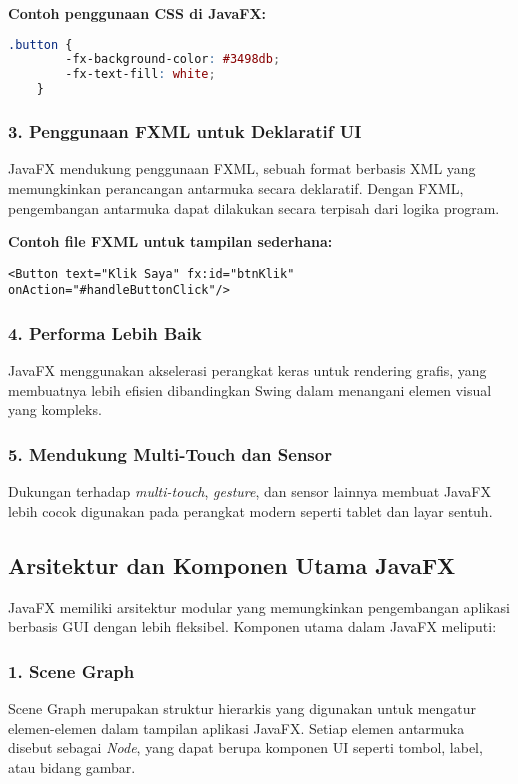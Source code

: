 \textbf{Contoh penggunaan CSS di JavaFX:}
\begin{lstlisting}[language=css, caption=Mengatur warna latar belakang tombol dengan CSS]
	.button {
		-fx-background-color: #3498db;
		-fx-text-fill: white;
	}
\end{lstlisting}

\subsubsection{3. Penggunaan FXML untuk Deklaratif UI}
JavaFX mendukung penggunaan FXML, sebuah format berbasis XML yang memungkinkan perancangan antarmuka secara deklaratif. Dengan FXML, pengembangan antarmuka dapat dilakukan secara terpisah dari logika program.

\textbf{Contoh file FXML untuk tampilan sederhana:}
\begin{lstlisting}[style=XmlStyle, caption=Contoh file FXML]
	<Button text="Klik Saya" fx:id="btnKlik" onAction="#handleButtonClick"/>
\end{lstlisting}

\subsubsection{4. Performa Lebih Baik}
JavaFX menggunakan akselerasi perangkat keras untuk rendering grafis, yang membuatnya lebih efisien dibandingkan Swing dalam menangani elemen visual yang kompleks.

\subsubsection{5. Mendukung Multi-Touch dan Sensor}
Dukungan terhadap \textit{multi-touch}, \textit{gesture}, dan sensor lainnya membuat JavaFX lebih cocok digunakan pada perangkat modern seperti tablet dan layar sentuh.

\subsection{Arsitektur dan Komponen Utama JavaFX}

JavaFX memiliki arsitektur modular yang memungkinkan pengembangan aplikasi berbasis GUI dengan lebih fleksibel. Komponen utama dalam JavaFX meliputi:

\subsubsection{1. Scene Graph}
Scene Graph merupakan struktur hierarkis yang digunakan untuk mengatur elemen-elemen dalam tampilan aplikasi JavaFX. Setiap elemen antarmuka disebut sebagai \textit{Node}, yang dapat berupa komponen UI seperti tombol, label, atau bidang gambar.


